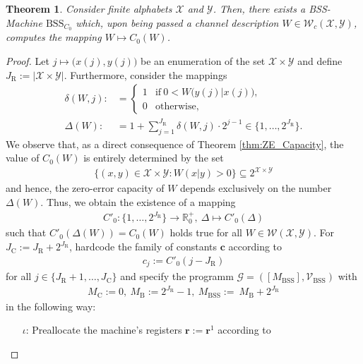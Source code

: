 \documentclass[conference]{IEEEtran}
\def\X{{\mathcal X}}
\def\Y{{\mathcal Y}}
\def\G{{\mathcal G}}
\def\V{{\mathcal V}}
\def\W{{\mathcal W}}
\def\RR{{\mathbb R}}
\newcommand{\BSS}{\mathrm{BSS}}
\newtheorem{Theorem}{Theorem}
\begin{document}
	\begin{Theorem}	Consider finite alphabets \(\X\) and \(\Y\). Then, there exists a BSS-Machine \(\BSS_{C_0}\)
					which, upon being passed a channel description \(W\in \W_c(\X,\Y)\), computes the mapping \(W \mapsto C_0(W)\).
	\end{Theorem}\begin{proof}
					Let \(j \mapsto \big(x(j), y(j)\big)\) be an enumeration of the set \(\X\times\Y\) and define
					\(J_\mathrm{R} := |\X\times \Y|\). Furthermore, consider the mappings
					\begin{align}	\delta(W,j) :&=     \begin{cases}   1   &\text{if}~ 0 < W\big(y(j)|x(j)\big), \\
																		0   &\text{otherwise},
														\end{cases}\\
									\Delta(W)   :&=     1 + \sum_{j=1}^{J_\mathrm{R}} \delta(W,j)\cdot 2^{j-1} \in \big\{1,\ldots,2^{J_\mathrm{R}}\big\}.
					\end{align} 
					We observe that, as a direct consequence of Theorem \ref{thm:ZE_Capacity}, the value of \(C_0(W)\) is 
					entirely determined by the set 
					\begin{align}   \{(x,y) \in \X\times \Y : W(x|y) > 0\} \subseteq 2^{\X\times\Y}
					\end{align} 
					and hence, the zero-error capacity of \(W\) depends exclusively on the number \(\Delta(W)\). Thus, we obtain the existence of a mapping
					\begin{align}	C'_0 : \big\{1,\ldots,2^{J_\mathrm{R}}\big\} \rightarrow \RR_0^+,~ \Delta \mapsto C'_0(\Delta)        
					\end{align}
					such that \(C'_0(\Delta(W)) = C_0(W)\) holds true for all \(W\in\W(\X,\Y)\). For \(J_\mathrm{C} := J_\mathrm{R} + 2^{J_\mathrm{R}}\), 
					hardcode the family of constants \(\bm{c}\) according to 
					\begin{align}   c_j := C'_0(j - J_\mathrm{R})
					\end{align}
					for all \(j\in \{J_\mathrm{R} + 1, \ldots, J_\mathrm{C}\}\) and specify the programm \(\G = ([M_\BSS],\V_\BSS)\) with
					\begin{align}	M_\mathrm{C} := 0,~M_\mathrm{B} := 2^{J_\mathrm{R}} - 1,~ M_\BSS := ~M_\mathrm{B} + 2^{J_\mathrm{R}}
					\end{align}
					in the following way:
					\begin{enumerate}	\item[\(\iota\)\hspace{1pt}:] Preallocate the machine's registers \(\bm{r} := \bm{r}^1\) according to

\end{enumerate}
\end{proof}
\end{document}
